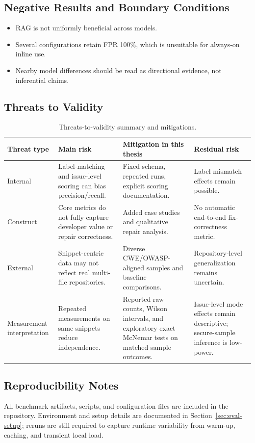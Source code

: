 \subsection*{Negative Results and Boundary Conditions}

\begin{itemize}
  \item RAG is not uniformly beneficial across models.
  \item Several configurations retain FPR 100\%, which is unsuitable for always-on inline use.
  \item Nearby model differences should be read as directional evidence, not inferential claims.
\end{itemize}

\subsection*{Threats to Validity}

\begin{table}[H]
  \centering
  \caption{Threats-to-validity summary and mitigations.}
  \label{tab:eval-validity-summary}
  \footnotesize
  \renewcommand{\arraystretch}{1.15}
  \begin{tabularx}{\textwidth}{p{}XXX}
    \toprule
    Threat type & Main risk & Mitigation in this thesis & Residual risk \\
    \midrule
    Internal & Label-matching and issue-level scoring can bias precision/recall. & Fixed schema, repeated runs, explicit scoring documentation. & Label mismatch effects remain possible. \\
    Construct & Core metrics do not fully capture developer value or repair correctness. & Added case studies and qualitative repair analysis. & No automatic end-to-end fix-correctness metric. \\
    External & Snippet-centric data may not reflect real multi-file repositories. & Diverse CWE/OWASP-aligned samples and baseline comparisons. & Repository-level generalization remains uncertain. \\
    Measurement interpretation & Repeated measurements on same snippets reduce independence. & Reported raw counts, Wilson intervals, and exploratory exact McNemar tests on matched sample outcomes. & Issue-level mode effects remain descriptive; secure-sample inference is low-power. \\
    \bottomrule
  \end{tabularx}
\end{table}

\subsection*{Reproducibility Notes}

All benchmark artifacts, scripts, and configuration files are included in the repository. Environment and setup details are documented in Section~\ref{sec:eval-setup}; reruns are still required to capture runtime variability from warm-up, caching, and transient local load.
